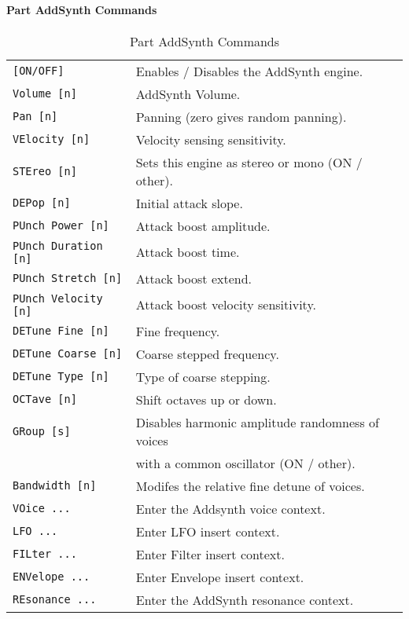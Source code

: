 \paragraph{Part AddSynth Commands}
\label{paragraph:command_line_part_addsynth_commands}
   \begin{table}[H]
      \centering
      \caption{Part AddSynth Commands}
      \label{table:yoshimi_part_addsynth_commands}
      \begin{tabular}{l l}
\texttt{[ON/OFF]} &
   Enables / Disables the AddSynth engine. \\
\texttt{Volume [n]} &
   AddSynth Volume.  \\
\texttt{Pan [n]} &
   Panning (zero gives random panning).\\
\texttt{VElocity [n]} &
   Velocity sensing sensitivity. \\
\texttt{STEreo [n]} &
   Sets this engine as stereo or mono (ON / other). \\
\texttt{DEPop [n]} &
   Initial attack slope.   \\
\texttt{PUnch Power [n]} &
   Attack boost amplitude. \\
\texttt{PUnch Duration [n]} &
   Attack boost time.   \\
\texttt{PUnch Stretch [n]} &
   Attack boost extend. \\
\texttt{PUnch Velocity [n]} &
   Attack boost velocity sensitivity.  \\
\texttt{DETune Fine [n]} &
   Fine frequency.   \\
\texttt{DETune Coarse [n]} &
   Coarse stepped frequency.  \\
\texttt{DETune Type [n]} &
   Type of coarse stepping.   \\
\texttt{OCTave [n]} &
   Shift octaves up or down.  \\
\texttt{GRoup [s]} &
   Disables harmonic amplitude randomness of voices \\
\texttt{ } &
             with a common oscillator (ON / other). \\
\texttt{Bandwidth [n]} &
   Modifes the relative fine detune of voices. \\
\texttt{VOice ...} &
   Enter the Addsynth voice context. \\
\texttt{LFO ...} &
   Enter LFO insert context.  \\
\texttt{FILter ...} &
   Enter Filter insert context.  \\
\texttt{ENVelope ...} &
   Enter Envelope insert context.   \\
\texttt{REsonance ...} &
   Enter the AddSynth resonance context. \\
      \end{tabular}
   \end{table}

